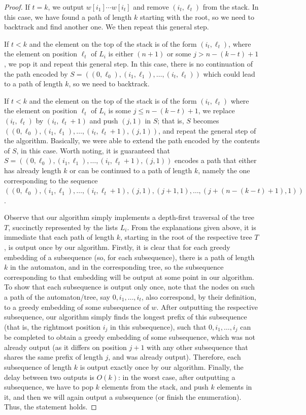 \documentclass[runningheads,UKenglish,cleveref, autoref, thm-restate]{llncs}
\begin{document}
\begin{proof}
If $t=k$, we output $w[i_1]\cdots w[i_t]$ and remove $(i_t, \ell_t)$ from the stack. In this case, we have found a path of length $k$ starting with the root, so we need to backtrack and find another one. We then repeat this general step.  

If $t<k$ and the element on the top of the stack is of the form $(i_t,\ell_t)$, where the element on position $\ell_t$ of $L_i$ is either $(n+1)$ or some $j>n-(k-t)+1$, we pop it and repeat this general step. In this case, there is no continuation of the path encoded by $S=((0,\ell_0), (i_1, \ell_1), \ldots, (i_t, \ell_t))$ which could lead to a path of length $k$, so we need to backtrack.

If $t<k$ and the element on the top of the stack is of the form $(i_t,\ell_t)$ where the element on position $\ell_t$ of $L_i$ is some $j\leq n-(k-t)+1$, we replace $(i_t, \ell_t)$ by $(i_t, \ell_t+1)$ and push $(j,1)$ in $S$; that is, $S$ becomes $((0,\ell_0), (i_1, \ell_1), \ldots, (i_t, \ell_t+1), (j,1))$, and repeat the general step of the algorithm. Basically, we were able to extend the path encoded by the contents of $S$, in this case. Worth noting, it is guaranteed that $S=((0,\ell_0), (i_1, \ell_1), \ldots, (i_t, \ell_t+1), (j,1))$ encodes a path that either has already length $k$ or can be continued to a path of length $k$, namely the one corresponding to the sequence $((0,\ell_0), (i_1, \ell_1), \ldots, (i_t, \ell_t+1), (j,1), (j+1,1),\ldots, (j+(n-(k-t)+1), 1))$. 

Observe that our algorithm simply implements a depth-first traversal of the tree $T$,  succinctly represented by the lists $L_i$. 
From the explanations given above, it is immediate that each path of length $k$, starting in the root of the respective tree $T$, is output once by our algorithm. Firstly, it is clear that for each greedy embedding of a subsequence (so, for each subsequence), there is a path of length $k$ in the automaton, and in the corresponding tree, so the subsequence corresponding to that embedding will be output at some point in our algorithm. To show that each subsequence is output only once, note that the nodes on such a path of the automaton/tree, say $0,i_1,  \ldots, i_t$, also correspond, by their definition, to a greedy embedding of some subsequence of $w$. After outputting the respective subsequence, our algorithm simply finds the longest prefix of this subsequence (that is, the rightmost position $i_j$ in this subsequence), such that $0,i_1,  \ldots, i_j$ can be completed to obtain a greedy embedding of some subsequence, which was not already output (as it differs on position $j+1$ with any other subsequence that shares the same prefix of length $j$, and was already output). Therefore, each subsequence of length $k$ is output exactly once by our algorithm. Finally, the delay between two outputs is $O(k)$: in the worst case, after outputting a subsequence, we have to pop $k$ elements from the stack, and push $k$ elements in it, and then we will again output a subsequence (or finish the enumeration). Thus, the statement holds. 
\end{proof}
\end{document}
